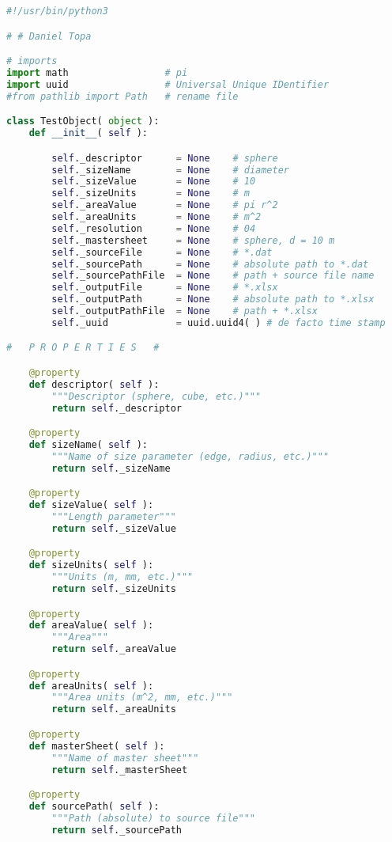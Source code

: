 % 

	{\tiny{
	\begin{lstlisting}[language=Python]
#!/usr/bin/python3

# # Daniel Topa

# imports
import math                 # pi
import uuid                 # Universal Unique IDentifier
#from pathlib import Path   # rename file

class TestObject( object ):
    def __init__( self ):

        self._descriptor      = None    # sphere
        self._sizeName        = None    # diameter
        self._sizeValue       = None    # 10
        self._sizeUnits       = None    # m
        self._areaValue       = None    # pi r^2
        self._areaUnits       = None    # m^2
        self._resolution      = None    # 04
        self._mastersheet     = None    # sphere, d = 10 m
        self._sourceFile      = None    # *.dat
        self._sourcePath      = None    # absolute path to *.dat
        self._sourcePathFile  = None    # path + source file name
        self._outputFile      = None    # *.xlsx
        self._outputPath      = None    # absolute path to *.xlsx
        self._outputPathFile  = None    # path + *.xlsx
        self._uuid            = uuid.uuid4( ) # de facto time stamp

#   P R O P E R T I E S   #

    @property
    def descriptor( self ):
        """Descriptor (sphere, cube, etc.)"""
        return self._descriptor

    @property
    def sizeName( self ):
        """Name of size parameter (edge, radius, etc.)"""
        return self._sizeName

    @property
    def sizeValue( self ):
        """Length parameter"""
        return self._sizeValue

    @property
    def sizeUnits( self ):
        """Units (m, mm, etc.)"""
        return self._sizeUnits

    @property
    def areaValue( self ):
        """Area"""
        return self._areaValue

    @property
    def areaUnits( self ):
        """Area units (m^2, mm, etc.)"""
        return self._areaUnits

    @property
    def masterSheet( self ):
        """Name of master sheet"""
        return self._masterSheet

    @property
    def sourcePath( self ):
        """Path (absolute) to source file"""
        return self._sourcePath


\end{lstlisting}}}
